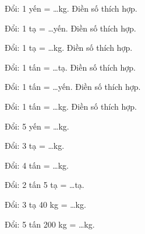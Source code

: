\begin{ex}
Đổi: 1 yến = \dots kg. Điền số thích hợp.
\end{ex}

\begin{ex}
Đổi: 1 tạ = \dots yến. Điền số thích hợp.
\end{ex}

\begin{ex}
Đổi: 1 tạ = \dots kg. Điền số thích hợp.
\end{ex}

\begin{ex}
Đổi: 1 tấn = \dots tạ. Điền số thích hợp.
\end{ex}

\begin{ex}
Đổi: 1 tấn = \dots yến. Điền số thích hợp.
\end{ex}

\begin{ex}
Đổi: 1 tấn = \dots kg. Điền số thích hợp.
\end{ex}

\begin{ex}
Đổi: 5 yến = \dots kg.
\end{ex}

\begin{ex}
Đổi: 3 tạ = \dots kg.
\end{ex}

\begin{ex}
Đổi: 4 tấn = \dots kg.
\end{ex}

\begin{ex}
Đổi: 2 tấn 5 tạ = \dots tạ.
\end{ex}

\begin{ex}
Đổi: 3 tạ 40 kg = \dots kg.
\end{ex}

\begin{ex}
Đổi: 5 tấn 200 kg = \dots kg.
\end{ex}


